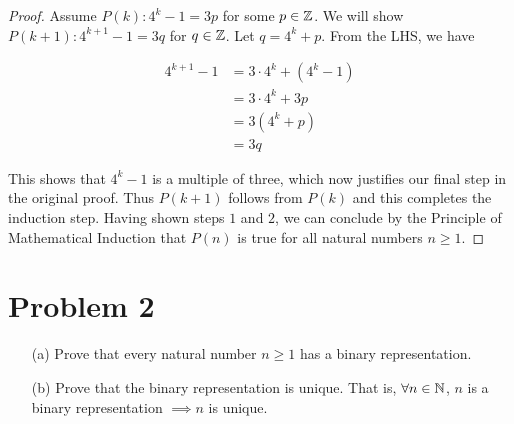 \documentclass[12pt, a4paper]{amsart}
\theoremstyle{definition}
\theoremstyle{remark}
\numberwithin{Theorem}{section}
\begin{document}
\begin{proof}
\istep

Assume $P(k) : 4^k - 1 = 3p$ for some $p \in \mathbb Z$. We will show 
$P(k + 1) : 4^{k+1} - 1 = 3q$ for $q \in \mathbb Z$. Let $q = 4^k + p$.
From the LHS, we have

\begin{align*}
    4^{k+1} - 1 &= 3\cdot 4^k + (4^k - 1) \\
    &= 3 \cdot 4^k + 3p \tag{By the I.H.} \\
    &= 3(4^k + p) \\
    &= 3q
\end{align*}

This shows that $4^k - 1$ is a multiple of three, which now
justifies our final step in the original proof.
Thus $P(k + 1)$ follows from $P(k)$ and this completes the induction step.
Having shown steps $1$ and $2$, we can conclude by the 
Principle of Mathematical Induction that $P(n)$ is true for all 
natural numbers $n \geqslant 1$.
    
\end{proof}

\newpage


\section{Problem 2}

\begin{enumerate}
    \item [(a)] Prove that every natural number $n \geqslant 1$ has
    a binary representation.
    
    \item [(b)] Prove that the binary representation is unique. That is,
    $\forall n \in \mathbb N$, $n$ is a binary representation $\implies n$
    is unique.
\end{enumerate}
\end{document}
